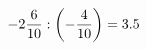 \documentclass[preview]{standalone}
\begin{document}
\begin{align*}
-2 { 6 \over 10 }  :  \left( - { 4 \over 10 } \right) = 3.5
\end{align*}
\end{document}
